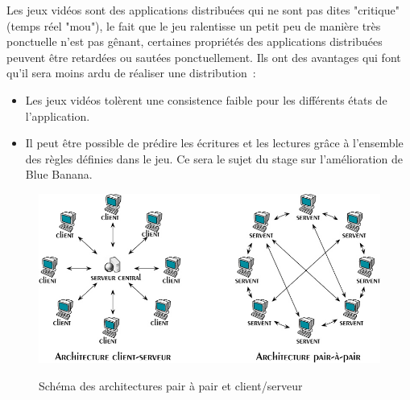 	Les jeux vidéos sont des applications distribuées qui ne sont pas dites "critique" (temps réel "mou"), le fait que le jeu ralentisse un petit peu de manière très ponctuelle n'est pas gênant, certaines propriétés des applications distribuées peuvent être retardées ou sautées ponctuellement. Ils ont des avantages qui font qu'il sera moins ardu de réaliser une distribution~\cite{1267692}:
	\begin{itemize}
		\renewcommand{\labelitemi}{$\bullet$}
		\item Les jeux vidéos tolèrent une consistence faible pour les différents états de l'application.
		\item Il peut être possible de prédire les écritures et les lectures grâce à l'ensemble des règles définies dans le jeu. Ce sera le sujet du stage sur l'amélioration de Blue Banana.
	\end{itemize}
	\vspace{1cm}
	\begin{figure}[!h]
	\centering
	\includegraphics[scale=0.5]{../Images/p2p-85145.png}\\
	\caption{Schéma des architectures pair à pair et client/serveur}
	\label{P2P/ClServ}
	\end{figure} 
\newpage
